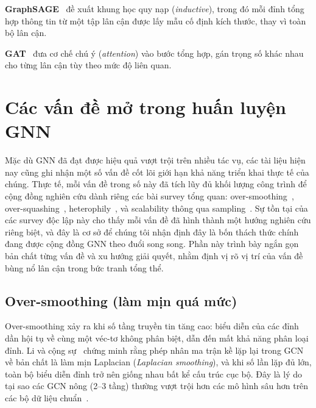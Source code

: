 \textbf{GraphSAGE}~\cite{Hamilton2017} đề xuất khung học quy nạp (\textit{inductive}), trong đó mỗi đỉnh tổng hợp thông tin từ một tập lân cận được lấy mẫu cố định kích thước, thay vì toàn bộ lân cận.

\textbf{GAT}~\cite{Velickovic2018} đưa cơ chế chú ý (\textit{attention}) vào bước tổng hợp, gán trọng số khác nhau cho từng lân cận tùy theo mức độ liên quan.

\section{Các vấn đề mở trong huấn luyện GNN}
\label{sec:gnn-challenges}

Mặc dù GNN đã đạt được hiệu quả vượt trội trên nhiều tác vụ, các tài liệu hiện nay cũng ghi nhận một số vấn đề cốt lõi giới hạn khả năng triển khai thực tế của chúng. Thực tế, mỗi vấn đề trong số này đã tích lũy đủ khối lượng công trình để cộng đồng nghiên cứu dành riêng các bài survey tổng quan: over-smoothing~\cite{Rusch2023SurveyOversmoothing}, over-squashing~\cite{Akansha2023SurveyOversquashing}, heterophily~\cite{Zheng2022SurveyHeterophily}, và scalability thông qua sampling~\cite{Liu2021ScalableSampling}. Sự tồn tại của các survey độc lập này cho thấy mỗi vấn đề đã hình thành một hướng nghiên cứu riêng biệt, và đây là cơ sở để chúng tôi nhận định đây là bốn thách thức chính đang được cộng đồng GNN theo đuổi song song. Phần này trình bày ngắn gọn bản chất từng vấn đề và xu hướng giải quyết, nhằm định vị rõ vị trí của vấn đề bùng nổ lân cận trong bức tranh tổng thể.

\subsection{Over-smoothing (làm mịn quá mức)}

Over-smoothing xảy ra khi số tầng truyền tin tăng cao: biểu diễn của các đỉnh dần hội tụ về cùng một véc-tơ không phân biệt, dẫn đến mất khả năng phân loại đỉnh. Li và cộng sự~\cite{Li2018DeeperInsights} chứng minh rằng phép nhân ma trận kề lặp lại trong GCN về bản chất là làm mịn Laplacian (\textit{Laplacian smoothing}), và khi số lần lặp đủ lớn, toàn bộ biểu diễn đỉnh trở nên giống nhau bất kể cấu trúc cục bộ. Đây là lý do tại sao các GCN nông (2--3 tầng) thường vượt trội hơn các mô hình sâu hơn trên các bộ dữ liệu chuẩn~\cite{Li2018DeeperInsights}.

